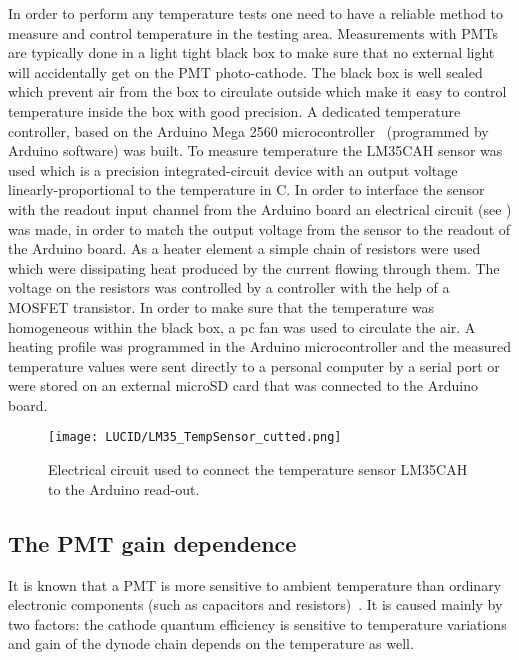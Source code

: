 In order to perform any temperature tests one need to have a reliable method to measure and control temperature in the testing area.
Measurements with PMTs are typically done in a light tight black box to make sure that no external light will accidentally get on the PMT photo-cathode.
The black box is well sealed which prevent air from the box to circulate outside which make it easy to control temperature inside the box with good 
precision.
A dedicated temperature controller, based on the Arduino Mega 2560 microcontroller~\cite{arduino} (programmed by Arduino software) was built.
To measure temperature the LM35CAH sensor was used which is a precision integrated-circuit device with an output voltage linearly-proportional to the 
temperature in C\degree.
In order to interface the sensor with the readout input channel from the Arduino board an electrical circuit 
(see ) was made, 
in order to match the output voltage from the sensor to the readout of the Arduino board.
As a heater element a simple chain of resistors were used which were dissipating heat produced by the current flowing through them. 
The voltage on the resistors was controlled by a controller with the help of a MOSFET transistor. 
In order to make sure that the temperature was homogeneous within the black box,
a pc fan was used to circulate the air. A heating profile was programmed in the Arduino microcontroller and 
the measured temperature values were sent directly to a personal computer by a serial port or were stored on an external microSD card 
that was connected to the Arduino board.
 
\begin{figure}
\centering
\texttt{[image: LUCID/LM35\_TempSensor\_cutted.png]}
\caption{Electrical circuit used to connect the temperature sensor LM35CAH to the Arduino read-out.}
\label{fig:tempReadOutCircuit}
\end{figure}
 
\subsection{The PMT gain dependence}
\label{subsec:pmtGainTempDep}

It is known that a PMT is more sensitive to ambient temperature than ordinary 
electronic components (such as capacitors and resistors)~\cite{hamamatsu}.
It is caused mainly by two factors: the cathode quantum efficiency is sensitive to 
temperature variations and gain of the dynode chain depends on the temperature as well.

